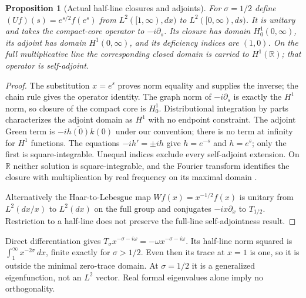 \documentclass[11pt]{article}
\theoremstyle{readable}
\newtheorem{proposition}[theorem]{Proposition}
\theoremstyle{remark}\newtheorem{remark}[theorem]{Remark}
\newcommand{\R}{\mathbb R}\newcommand{\C}{\mathbb C}\newcommand{\Z}{\mathbb Z}
\newcommand{\dd}{\,d}\newcommand{\norm}[1]{\left\lVert#1\right\rVert}
\begin{document}
\begin{proposition}[Actual half-line closures and adjoints]
For $\sigma=1/2$ define
$(Uf)(s)=e^{s/2}f(e^s)$ from $L^2([1,\infty),dx)$ to $L^2([0,\infty),ds)$.
It is unitary and takes the compact-core operator to $-i\partial_s$.
Its closure has domain $H^1_0(0,\infty)$, its adjoint has domain
$H^1(0,\infty)$, and its deficiency indices are $(1,0)$.
On the full multiplicative line the corresponding closed domain is carried
to $H^1(\R)$; that operator is self-adjoint.
\end{proposition}
\begin{proof}
The substitution $x=e^s$ proves norm equality and supplies the inverse;
the chain rule gives the operator identity. The graph norm of $-i\partial_s$
is exactly the $H^1$ norm, so closure of the compact core is $H^1_0$.
Distributional integration by parts characterizes the adjoint domain as
$H^1$ with no endpoint constraint. The adjoint Green term is
$-i\overline{h(0)}k(0)$ under our convention; there is no term at infinity
for $H^1$ functions. The equations $-ih'=\pm ih$ give $h=e^{-s}$ and
$h=e^s$; only the first is square-integrable. Unequal indices exclude every
self-adjoint extension. On $\R$ neither solution is square-integrable,
and the Fourier transform identifies the closure with multiplication by
real frequency on its maximal domain \cite{reed}.

Alternatively the Haar-to-Lebesgue map $Wf(x)=x^{-1/2}f(x)$ is unitary
from $L^2(dx/x)$ to $L^2(dx)$ on the full group and conjugates
$-ix\partial_x$ to $T_{1/2}$. Restriction to a half-line does not preserve
the full-line self-adjointness result.
\end{proof}
Direct differentiation gives $T_\sigma x^{-\sigma-i\omega}
=-\omega x^{-\sigma-i\omega}$. Its half-line norm squared is
$\int_1^\infty x^{-2\sigma}\dd x$, finite exactly for $\sigma>1/2$.
Even then its trace at $x=1$ is one, so it is outside the minimal zero-trace
domain. At $\sigma=1/2$ it is a generalized eigenfunction, not an $L^2$
vector. Real formal eigenvalues alone imply no orthogonality.
\end{document}
